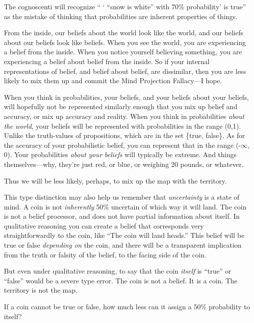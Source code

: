 {
 The cognoscenti will recognize
`` ` ``snow is
white'' with 70\% probability' is
true'' as the mistake of thinking that probabilities
are inherent properties of things.}

{
 From the inside, our beliefs about the world look like the world,
and our beliefs about our beliefs look like beliefs. When you see the
world, you are experiencing a belief from the inside. When you notice
yourself believing something, you are experiencing a belief about
belief from the inside. So if your internal representations of belief,
and belief about belief, are dissimilar, then you are less likely to
mix them up and commit the Mind Projection Fallacy---I hope.}

{
 When you think in probabilities, your beliefs, and your beliefs
about your beliefs, will hopefully not be represented similarly enough
that you mix up belief and accuracy, or mix up accuracy and reality.
When you think in probabilities \textit{about the world}, your beliefs
will be represented with probabilities in the range (0,1). Unlike the
truth-values of propositions, which are in the set
\{true,
false\}. As for the accuracy of your
probabilistic belief, you can represent that in the range (-${\infty}$,
0). Your probabilities \textit{about your} \textit{beliefs} will
typically be extreme. And things themselves---why,
they're just red, or blue, or weighing 20 pounds, or
whatever.}

{
 Thus we will be less likely, perhaps, to mix up the map with the
territory.}

{
 This type distinction may also help us remember that
\textit{uncertainty} is a state of mind. A coin is not
\textit{inherently} 50\% uncertain of which way it will land. The coin
is not a belief processor, and does not have partial information about
itself. In qualitative reasoning you can create a belief that
corresponds very straightforwardly to the coin, like
``The coin will land heads.'' This
belief will be true or false \textit{depending on} the coin, and there
will be a transparent implication from the truth or falsity of the
belief, to the facing side of the coin.}

{
 But even under qualitative reasoning, to say that the coin
\textit{itself} is ``true'' or
``false'' would be a severe type
error. The coin is not a belief. It is a coin. The territory is not the
map.}

{
 If a coin cannot be true or false, how much less can it assign a
50\% probability to itself?}

\myendsectiontext

